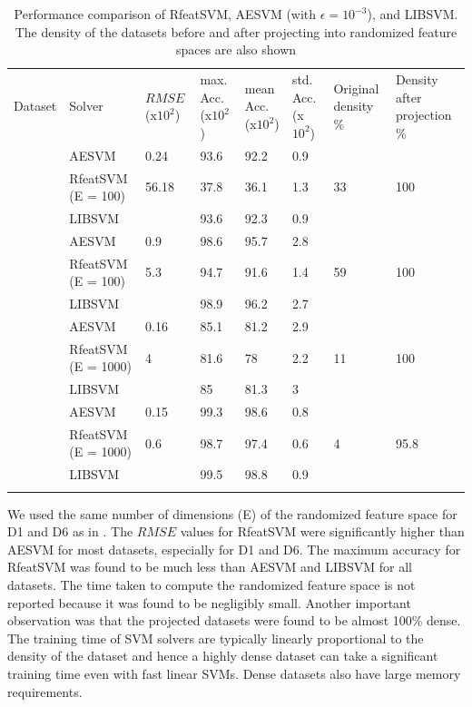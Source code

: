 \documentclass[twoside]{article}
\begin{document}
\begin{table}[h!]
\begin{center}
\begin{tabular}{|@{}p{1.2cm}|@{}p{2cm}@{}!{\vrule width 1pt}@{}p{1.3cm}|@{}p{1.8cm}|@{}p{1.8cm}|@{}p{1.6cm}|@{}p{1.6cm}|@{}p{2cm}|} \hline
Dataset & Solver & $RMSE$ (x$10^2$) & max. Acc. (x$10^2$)& mean Acc. (x$10^2$)& std. Acc. (x$10^2$) & Original density \% & Density after projection \%\\ 
 &  AESVM & 0.24 & 93.6 & 92.2 & 0.9 & & \\ 
& RfeatSVM (E = 100)& 56.18 & 37.8 & 36.1 & 1.3 & 33 & 100\\ 
& LIBSVM &   & 93.6 & 92.3 & 0.9 & & \\ 
 &  AESVM &  0.9 & 98.6 & 95.7 & 2.8 & & \\ 
& RfeatSVM (E = 100) & 5.3 & 94.7 & 91.6 & 1.4 & 59& 100\\ 
& LIBSVM &   & 98.9 & 96.2 & 2.7 & & \\ 
 &  AESVM &  0.16 & 85.1 & 81.2 & 2.9 & & \\ 
& RfeatSVM (E = 1000) &  4 & 81.6 & 78 & 2.2 & 11 & 100\\ 
& LIBSVM &   & 85 & 81.3 & 3 & & \\ 
 &  AESVM & 0.15 & 99.3 & 98.6 & 0.8 & & \\ 
& RfeatSVM (E = 1000) & 0.6 & 98.7 & 97.4 & 0.6 & 4 & 95.8\\ 
& LIBSVM &  & 99.5 & 98.8 & 0.9 & & \\ 
\end{tabular}
\end{center}
\caption{Performance comparison of RfeatSVM, AESVM (with $\epsilon = 10^{-3}$), and LIBSVM. The density of the datasets before and after projecting into randomized feature spaces are also shown}
\label{tb:testing6}
\end{table}

We used the same number of dimensions (E) of the randomized feature space for D1 and D6 as in \citet{rahimi07}. The $RMSE$ values for RfeatSVM were significantly higher than AESVM for most datasets, especially for D1 and D6. The maximum accuracy for RfeatSVM was found to be much less than AESVM and LIBSVM for all datasets. The time taken to compute the randomized feature space is not reported because it was found to be negligibly small. Another important observation was that the projected datasets were found to be almost 100\% dense. The training time of SVM solvers are typically linearly proportional to the density of the dataset and hence a highly dense dataset can take a significant training time even with fast linear SVMs. Dense datasets also have large memory requirements.
\end{document}
